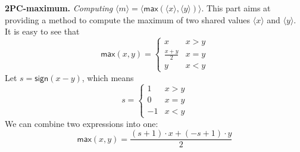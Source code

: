 \documentclass[letterpaper]{article} %
\begin{document}
    \textbf{2PC-maximum.}
    \emph{Computing} $ \langle m \rangle  = \langle \mathsf{max}(\langle x\rangle,\langle y\rangle)\rangle $.
       This part aims at providing a method to compute the maximum of two shared values $\langle x \rangle$ and $\langle y \rangle$.
       It is easy to see that
       $$\mathsf{max}(x,y) = \left\{\begin{matrix}
           x & x>y\\
           \frac{x+ y}{2} & x=y\\
           y & x<y
           \end{matrix}\right.$$
       Let $s = \mathsf{sign}(x-y)$, which means
       $$s = \left\{\begin{matrix}
           1 & x>y\\
           0 & x=y\\
           -1 & x<y
           \end{matrix}\right.$$
       We can combine two expressions into one:
       $$\mathsf{max}(x,y) = \frac{(s+1)\cdot x+ (-s+1)\cdot y}{2}$$
\end{document}
